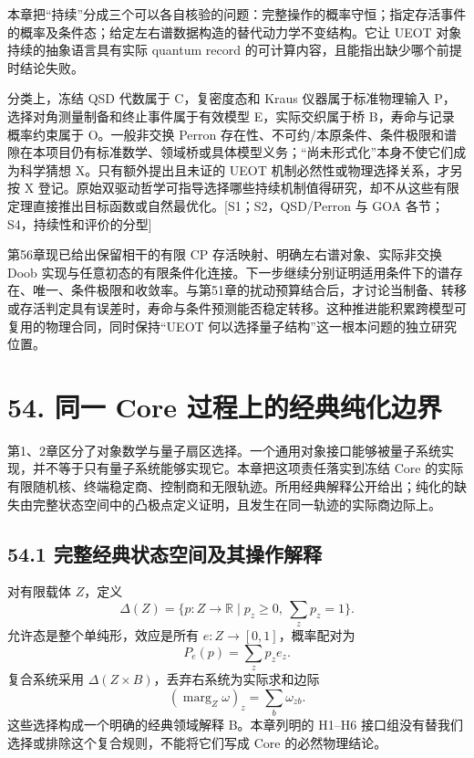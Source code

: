 \documentclass[
  11pt,
  oneside]{book}
\begin{document}
本章把``持续''分成三个可以各自核验的问题：完整操作的概率守恒；指定存活事件的概率及条件态；给定左右谱数据构造的替代动力学不变结构。它让
UEOT 对象持续的抽象语言具有实际 quantum record
的可计算内容，且能指出缺少哪个前提时结论失败。

分类上，冻结 QSD 代数属于 C，复密度态和 Kraus 仪器属于标准物理输入
P，选择对角测量制备和终止事件属于有效模型 E，实际交织属于桥
B，寿命与记录概率约束属于 O。一般非交换 Perron
存在性、不可约/本原条件、条件极限和谱隙在本项目仍有标准数学、领域桥或具体模型义务；``尚未形式化''本身不使它们成为科学猜想
X。只有额外提出且未证的 UEOT 机制必然性或物理选择关系，才另按 X
登记。原始双驱动哲学可指导选择哪些持续机制值得研究，却不从这些有限定理直接推出目标函数或自然最优化。{[}S1；S2，QSD/Perron
与 GOA 各节；S4，持续性和评价的分型{]}

第56章现已给出保留相干的有限 CP 存活映射、明确左右谱对象、实际非交换
Doob
实现与任意初态的有限条件化连接。下一步继续分别证明适用条件下的谱存在、唯一、条件极限和收敛率。与第51章的扰动预算结合后，才讨论当制备、转移或存活判定具有误差时，寿命与条件预测能否稳定转移。这种推进能积累跨模型可复用的物理合同，同时保持``UEOT
何以选择量子结构''这一根本问题的独立研究位置。

\hypertarget{ch-54}{%
\chapter{54. 同一 Core 过程上的经典纯化边界}\label{ch-54}}

第1、2章区分了对象数学与量子扇区选择。一个通用对象接口能够被量子系统实现，并不等于只有量子系统能够实现它。本章把这项责任落实到冻结
Core
的实际有限随机核、终端稳定商、控制商和无限轨迹。所用经典解释公开给出；纯化的缺失由完整状态空间中的凸极点定义证明，且发生在同一轨迹的实际商边际上。

\hypertarget{ux5b8cux6574ux7ecfux5178ux72b6ux6001ux7a7aux95f4ux53caux5176ux64cdux4f5cux89e3ux91ca}{%
\section{54.1
完整经典状态空间及其操作解释}\label{ux5b8cux6574ux7ecfux5178ux72b6ux6001ux7a7aux95f4ux53caux5176ux64cdux4f5cux89e3ux91ca}}

对有限载体 \(Z\)，定义 \[
\Delta(Z)=\{p:Z\to\mathbb R\mid p_z\ge0,\ \sum_zp_z=1\}.
\] 允许态是整个单纯形，效应是所有 \(e:Z\to[0,1]\)，概率配对为 \[
P_e(p)=\sum_zp_ze_z.
\] 复合系统采用 \(\Delta(Z\times B)\)，丢弃右系统为实际求和边际 \[
(\operatorname{marg}_Z\omega)_z=\sum_b\omega_{zb}.
\] 这些选择构成一个明确的经典领域解释 B。本章列明的 H1--H6
接口组没有替我们选择或排除这个复合规则，不能将它们写成 Core
的必然物理结论。
\end{document}
